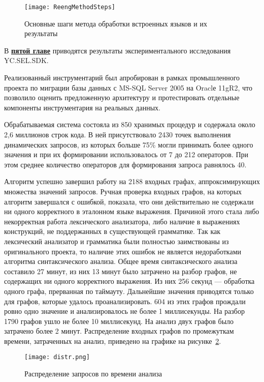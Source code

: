 \begin{figure}[h!]
\begin{center}
\texttt{[image: ReengMethodSteps]}
\caption{Основные шаги метода обработки встроенных языков и их результаты}
\label{fig:method} 
\end{center}
\end{figure}


В \underline{\textbf{пятой главе}} приводятся результаты экспериментального исследования YC.SEL.SDK.

Реализованный инструментарий был апробирован в рамках промышленного проекта по миграции базы данных с MS-SQL Server 2005 на Oraclе 11gR2, что позволило оценить предложенную архитектуру и протестировать отдельные компоненты инструментария на реальных данных.

Обрабатываемая система состояла из 850 хранимых процедур и содержала около 2,6 миллионов строк кода. В ней присутствовало 2430 точек выполнения динамических запросов, из которых больше 75\% могли принимать 
более одного значения и при их формировании использовалось от 7 до 212 операторов. При этом среднее количество операторов для формирования запроса равнялось 40.

Алгоритм успешно завершил работу на 2188 входных графах, аппроксимирующих множества значений запросов. Ручная проверка входных графов, на которых алгоритм завершался с ошибкой, показала, что они действительно не содержали ни одного корректного в эталонном языке выражения. Причиной этого стала либо некорректная работа лексического анализатора, либо наличие в выражениях конструкций, не поддержанных в существующей грамматике. Так как лексический анализатор и грамматика были полностью заимствованы из оригинального проекта, то наличие этих ошибок не является недоработками алгоритма синтаксического анализа. Общее время синтаксического анализа составило 27 минут, из них 13 минут было затрачено на разбор графов, не содержащих ни одного корректного выражения. Из них 256 секунд --- обработка одного графа, прерванная по таймауту. Дальнейшие значения приводятся только для графов, которые удалось проанализировать. 604 из этих графов прождали ровно одно значение и анализировалось не более 1 миллисекунды. На разбор 1790 графов ушло не более 10 миллисекунд. На анализ двух графов было затрачено более 2 минут. Распределение входных графов по промежуткам времени, затраченных на анализ, приведено на графике на рисунке~\ref{distr}.

\begin{figure}[H]
  \centering
 \texttt{[image: distr.png]}
 \caption{Распределение запросов по времени анализа}
 \label{distr}
\end{figure}


